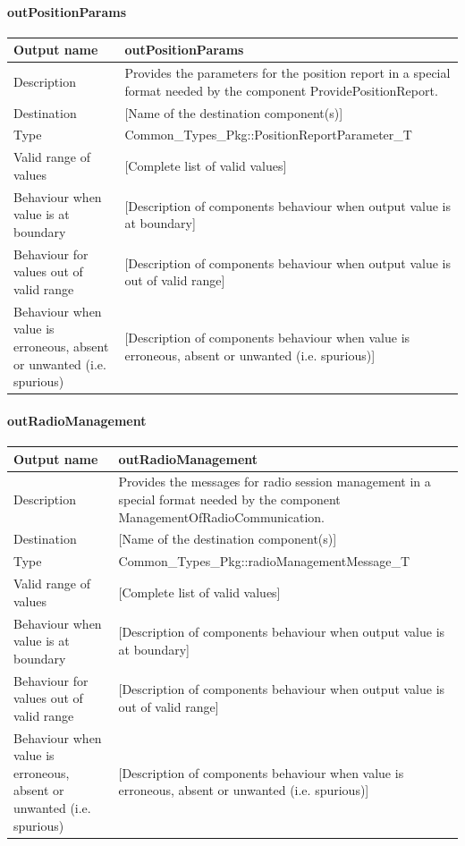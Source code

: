 \paragraph{outPositionParams}

\begin{longtable}{p{}p{}}
\toprule
Output name				& outPositionParams \\
\midrule
Description				& Provides the parameters for the position report in a special format needed by the component ProvidePositionReport. \\
\midrule
Destination				& [Name of the destination component(s)] \\ 
\midrule
Type					& Common\_Types\_Pkg::PositionReportParameter\_T \\
\midrule
Valid range of values	& [Complete list of valid values] \\
\midrule
Behaviour when value is at boundary	& [Description of components behaviour when output value is at boundary] \\
\midrule
Behaviour for values out of valid range	& [Description of components behaviour when output value is out of valid range] \\
\midrule
Behaviour when value is erroneous, absent or unwanted (i.e. spurious) & [Description of components behaviour when value is erroneous, absent or unwanted (i.e. spurious)] \\
\bottomrule
\end{longtable}


\paragraph{outRadioManagement}

\begin{longtable}{p{}p{}}
\toprule
Output name				& outRadioManagement \\
\midrule
Description				& Provides the messages for radio session management in a special format needed by the component ManagementOfRadioCommunication. \\
\midrule
Destination				& [Name of the destination component(s)] \\ 
\midrule
Type					& Common\_Types\_Pkg::radioManagementMessage\_T \\
\midrule
Valid range of values	& [Complete list of valid values] \\
\midrule
Behaviour when value is at boundary	& [Description of components behaviour when output value is at boundary] \\
\midrule
Behaviour for values out of valid range	& [Description of components behaviour when output value is out of valid range] \\
\midrule
Behaviour when value is erroneous, absent or unwanted (i.e. spurious) & [Description of components behaviour when value is erroneous, absent or unwanted (i.e. spurious)] \\
\bottomrule
\end{longtable}


